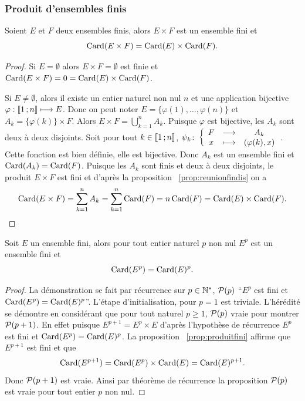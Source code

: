 \subsubsection{Produit d'ensembles finis}
\begin{prop}\label{prop:produitfini}
  Soient \(E\) et \(F\) deux ensembles finis, alors \(E\times F\) est un ensemble fini et
  \begin{equation}
    \Card(E\times F)=\Card(E)\times \Card(F).
  \end{equation}
\end{prop}
\begin{proof}
Si \(E=\emptyset\) alors \(E\times F=\emptyset\) est finie et \(\Card(E\times F)=0=\Card(E)\times \Card(F)\).
  
Si \(E\neq\emptyset\), alors il existe un entier naturel non nul \(n\) et une application bijective \(\varphi:\intervalleentier{1}{n}\longmapsto E\). Donc on peut noter \(E=\{\varphi(1),\ldots ,\varphi(n)\}\) et \(A_k=\{\varphi(k)\}\times F\). Alors \(E\times F=\bigcup_{k=1}^n A_k\). Puisque \(\varphi\) est bijective, les \(A_k\) sont deux à deux disjoints. Soit pour tout \(k\in\intervalleentier{1}{n}\), \(\fonction{\psi_k}{F}{A_k}{x}{(\varphi(k),x)}\). Cette fonction est bien définie, elle est bijective. Donc \(A_k\) est un ensemble fini et \(\Card(A_k)=\Card(F)\). Puisque les \(A_k\) sont finis et deux à deux disjoints, le produit \(E\times F\) est fini et d'après la proposition~
\ref{prop:reunionfindis} on a
    \begin{equation}
      \Card(E\times F)=\sum_{k=1}^{n} A_k=\sum_{k=1}^{n}\Card(F)=n\Card(F)=\Card(E)\times \Card(F).
    \end{equation}
\end{proof}
\begin{prop}
  Soit \(E\) un ensemble fini, alors pour tout entier naturel \(p\) non nul \(E^p\) est un ensemble fini et
  \begin{equation}
    \Card(E^p)=\Card(E)^p.
  \end{equation}
\end{prop}
\begin{proof}
  La démonstration se fait par récurrence sur \(p\in\N^*\), \(\P(p)\) ``\(E^p\) est fini et \(\Card(E^p)=\Card(E)^p\)''. L'étape d'initialisation, pour \(p=1\) est triviale. L'hérédité se démontre en considérant que pour tout naturel \(p\geqslant 1\), \(\P(p)\) vraie pour montrer \(\P(p+1)\). En effet puisque \(E^{p+1}=E^p \times E\) d'après l'hypothèse de récurrence \(E^p\) est fini et \(\Card(E^p)=\Card(E)^p\). La proposition~
\ref{prop:produitfini} affirme que \(E^{p+1}\) est fini et que
  \begin{equation}
    \Card(E^{p+1})=\Card(E^p)\times \Card(E)=\Card(E)^{p+1}.
  \end{equation}
  Donc \(\P(p+1)\) est vraie. Ainsi par théorème de récurrence la proposition \(\P(p)\) est vraie pour tout entier \(p\) non nul.
\end{proof}

